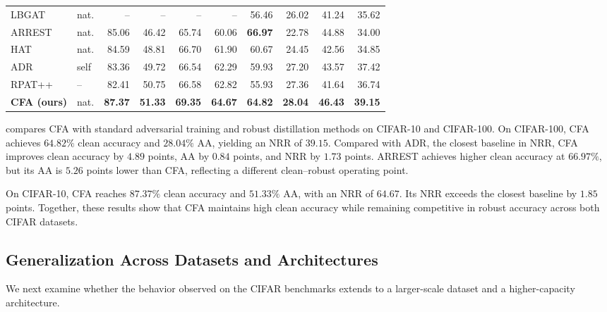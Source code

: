 \documentclass{article} %
\theoremstyle{plain}
\begin{document}
\begin{table}[!htbp]
\begin{tabular}{llrrrrrrrr}
    LBGAT & nat. & -- & -- & -- & --
                 & 56.46 & 26.02 & 41.24 & 35.62 \\
    ARREST & nat. & 85.06 & 46.42 & 65.74 & 60.06
                  & \textbf{66.97} & 22.78 & 44.88 & 34.00 \\
    \midrule
    HAT & nat. & 84.59 & 48.81 & 66.70 & 61.90
               & 60.67 & 24.45 & 42.56 & 34.85 \\
    ADR & self & 83.36 & 49.72 & 66.54 & 62.29
               & 59.93 & 27.20 & 43.57 & 37.42 \\
    RPAT++ & -- & 82.41 & 50.75 & 66.58 & 62.82
                  & 55.93 & 27.36 & 41.64 & 36.74 \\
    \midrule
    \textbf{CFA (ours)}
      & nat.
      & \textbf{87.37} & \textbf{51.33}
      & \textbf{69.35} & \textbf{64.67}
      & \textbf{64.82} & \textbf{28.04}
      & \textbf{46.43} & \textbf{39.15} \\
    \bottomrule
  \end{tabular}
\end{table}

 compares CFA with standard adversarial training and robust
distillation methods on CIFAR-10 and CIFAR-100.
On CIFAR-100, CFA achieves \(64.82\%\) clean accuracy and \(28.04\%\) AA,
yielding an NRR of \(39.15\).
Compared with ADR, the closest baseline in NRR, CFA improves clean accuracy
by \(4.89\) points, AA by \(0.84\) points, and NRR by \(1.73\) points.
ARREST achieves higher clean accuracy at \(66.97\%\), but its AA is
\(5.26\) points lower than CFA, reflecting a different clean--robust
operating point.

On CIFAR-10, CFA reaches \(87.37\%\) clean accuracy and \(51.33\%\) AA,
with an NRR of \(64.67\).
Its NRR exceeds the closest baseline by \(1.85\) points.
Together, these results show that CFA maintains high clean accuracy while
remaining competitive in robust accuracy across both CIFAR datasets.


\subsection{Generalization Across Datasets and Architectures}

We next examine whether the behavior observed on the CIFAR benchmarks
extends to a larger-scale dataset and a higher-capacity architecture.
\end{document}
